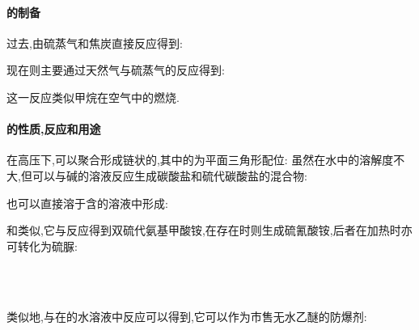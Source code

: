 \documentclass{ctexart}
\begin{document}
\paragraph{的制备}
过去,由硫蒸气和焦炭直接反应得到:
\begin{center}
\end{center}
现在则主要通过天然气与硫蒸气的反应得到:
\begin{center}
\end{center}
这一反应类似甲烷在空气中的燃烧.
\paragraph{的性质,反应和用途}
在高压下,可以聚合形成链状的,其中的为平面三角形配位:
\indent {}虽然在水中的溶解度不大,但可以与碱的溶液反应生成碳酸盐和硫代碳酸盐的混合物:
\begin{center}
\end{center}
也可以直接溶于含的溶液中形成:
\begin{center}
\end{center}

\indent 和类似,它与反应得到双硫代氨基甲酸铵,在存在时则生成硫氰酸铵,后者在加热时亦可转化为硫脲:
\begin{center}
    \\
    \\
\end{center}
类似地,与在的水溶液中反应可以得到,它可以作为市售无水乙醚的防爆剂:
\begin{center}
\end{center}
\end{document}
